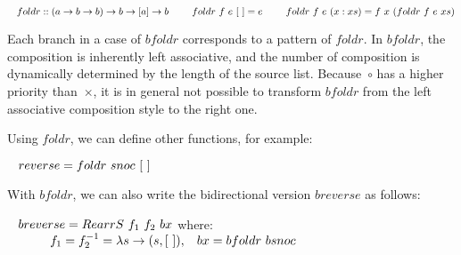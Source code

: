 $\tab foldr :: (a \to b \to b) \to b \to [a] \to b \\
\tabs{2} \ \ foldr \ f \ e \ [\ ] = e \\ 
\tabs{2} \ \ foldr \ f \ e \ (x:xs) = f \ x \ (foldr \ f \ e \ xs)$

Each branch in a case of $\textit{bfoldr}$ corresponds to a pattern of $foldr$. In $\textit{bfoldr}$, the composition is inherently left associative, and the number of composition is dynamically determined by the length of the source list. Because~$\circ$ has a higher priority than~$\times$, it is in general not possible to transform $\textit{bfoldr}$ from the left associative composition style to the right one. 

Using $\textit{foldr}$, we can define other functions, for example: 

$\tab reverse = foldr \ snoc \ [\ ]$

With $\textit{bfoldr}$, we can also write the bidirectional version $breverse$ as follows:

$\tab breverse = RearrS \ f_1 \ f_2 \ bx$ where:\\
    $\tabs{4} f_1 = f_2^{-1} = \lambda s \to (s, [\ ]), \tab bx = bfoldr \ bsnoc$